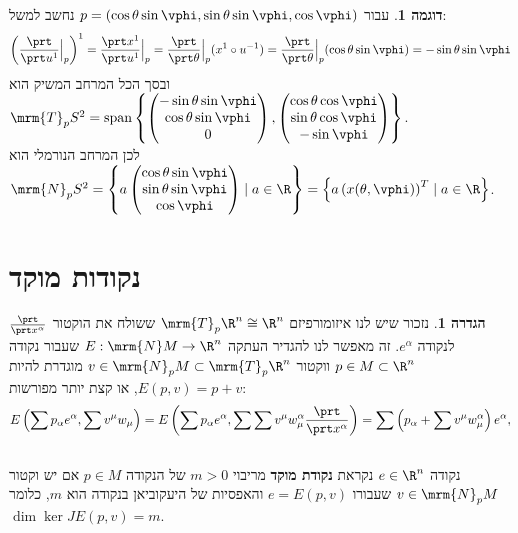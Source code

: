 \documentclass{article}
\theoremstyle{definition}
\newtheorem*{definition*}{הגדרה}
\newtheorem*{example*}{דוגמה}
\DeclareMathOperator{\spn}{span}
\begin{document}
	\begin{example*}
		עבור
		\(p=(\cos\theta \sin\vphi, \sin\theta \sin\vphi, \cos\vphi)\)
		נחשב למשל:
		\[
			\left(\frac{\prt}{\prt u^1}\Big|_p\right)^1
			= \frac{\prt x^1}{\prt u^1}\Big|_p
			= \frac{\prt}{\prt \theta}\Big|_p (x^1 \circ u^{-1})
			= \frac{\prt}{\prt \theta}\Big|_p (\cos\theta \sin\vphi)
			= -\sin\theta \sin\vphi
		\]
		ובסך הכל המרחב המשיק הוא
		\(
			\mrm{T}_p S^2
			= \spn\left\{
				\begin{pmatrix}
					-\sin\theta \sin\vphi \\ \cos\theta \sin\vphi \\ 0
				\end{pmatrix},
				\begin{pmatrix}
					\cos\theta \cos\vphi \\ \sin\theta \cos\vphi \\ -\sin\vphi
				\end{pmatrix}
			\right\}
		\).
		\\
		לכן המרחב הנורמלי הוא
		\(
			\mrm{N}_p S^2
			= \left\{
				a
				\begin{pmatrix}
					\cos\theta \sin\vphi \\ \sin\theta \sin\vphi \\ \cos\vphi
				\end{pmatrix}
				\mid
				a \in \R
			\right\}
			= \left\{
				a
				\left(x(\theta, \vphi)\right)^T
				\mid
				a \in \R
			\right\}
		\).
	\end{example*}




	\section{נקודות מוקד}

	\begin{definition*}
		נזכור שיש לנו איזומורפיזם
		\(\mrm{T}_p \R^n \cong \R^n\)
		ששולח את הוקטור
		\(\frac{\prt}{\prt x^\alpha}\)
		לנקודה
		\(e^\alpha\).
		זה מאפשר לנו להגדיר העתקה
		\(E:\mrm{N} M \to \R^n\)
		שעבור נקודה
		\(p \in M \subset \R^n\)
		ווקטור
		\(v \in \mrm{N}_p M \subset \mrm{T}_p \R^n\)
		מוגדרת להיות
		\(E(p,v)=p+v\),
		או קצת יותר מפורשות:
		\[
			E\left(\sum p_\alpha e^\alpha,\sum v^\mu w_\mu\right)
			= E\left(\sum p_\alpha e^\alpha,\sum \sum v^\mu w_\mu^\alpha \frac{\prt}{\prt x^\alpha}\right)
			= \sum \left(p_\alpha + \sum v^\mu w_\mu^\alpha\right) e^\alpha,
		\]
		\\
		נקודה
		\(e \in \R^n\)
		נקראת \textbf{נקודת מוקד} מריבוי
		\(m>0\)
		של הנקודה
		\(p \in M\)
		אם יש וקטור
		\(v \in \mrm{N}_p M\)
		שעבורו
		\(e = E(p,v)\)
		והאפסיות של היעקוביאן בנקודה הוא \(m\), כלומר
		\(\dim \ker JE(p,v) = m\).
	\end{definition*}
\end{document}
